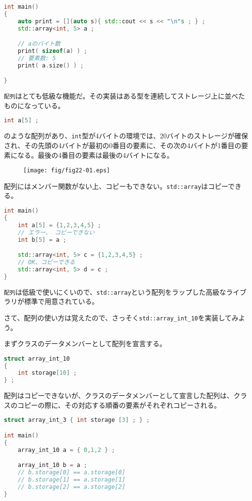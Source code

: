 \begin{lstlisting}[language={C++}]
int main()
{
    auto print = [](auto s){ std::cout << s << "\n"s ; } ;
    std::array<int, 5> a ;

    // aのバイト数
    print( sizeof(a) ) ;
    // 要素数: 5
    print( a.size() ) ;

}
\end{lstlisting}

\texttt{配列}はとても低級な機能だ。その実装はある型を連続してストレージ上に並べたものになっている。

\ifTombow\pagebreak\fi
\begin{lstlisting}[language={C++}]
int a[5] ;
\end{lstlisting}
のような配列があり、\texttt{int}型が4バイトの環境では、20バイトのストレージが確保され、その先頭の4バイトが最初の0番目の要素に、その次の4バイトが1番目の要素になる。最後の4番目の要素は最後の4バイトになる。

\begin{figure}[htbp]
  \centering
  \texttt{[image: fig/fig22-01.eps]}
  \label{fig:22-01}
\end{figure}

配列にはメンバー関数がない上、コピーもできない。\texttt{std::array}はコピーできる。

\begin{lstlisting}[language={C++}]
int main()
{
    int a[5] = {1,2,3,4,5} ;
    // エラー、 コピーできない
    int b[5] = a ;

    std::array<int, 5> c = {1,2,3,4,5} ;
    // OK、コピーできる
    std::array<int, 5> d = c ;
}
\end{lstlisting}

\texttt{配列}は低級で使いにくいので、\texttt{std::array}という配列をラップした高級なライブラリが標準で用意されている。

さて、配列の使い方は覚えたので、さっそく\texttt{std::array\_int\_10}を実装してみよう。

まずクラスのデータメンバーとして配列を宣言する。

\begin{lstlisting}[language={C++}]
struct array_int_10
{
    int storage[10] ;
} ;
\end{lstlisting}

配列はコピーできないが、クラスのデータメンバーとして宣言した配列は、クラスのコピーの際に、その対応する順番の要素がそれぞれコピーされる。

\begin{lstlisting}[language={C++}]
struct array_int_3 { int storage [3] ; } ;

int main()
{
    array_int_10 a = { 0,1,2 } ;

    array_int_10 b = a ;
    // b.storage[0] == a.storage[0] 
    // b.storage[1] == a.storage[1] 
    // b.storage[2] == a.storage[2] 
}
\end{lstlisting}


